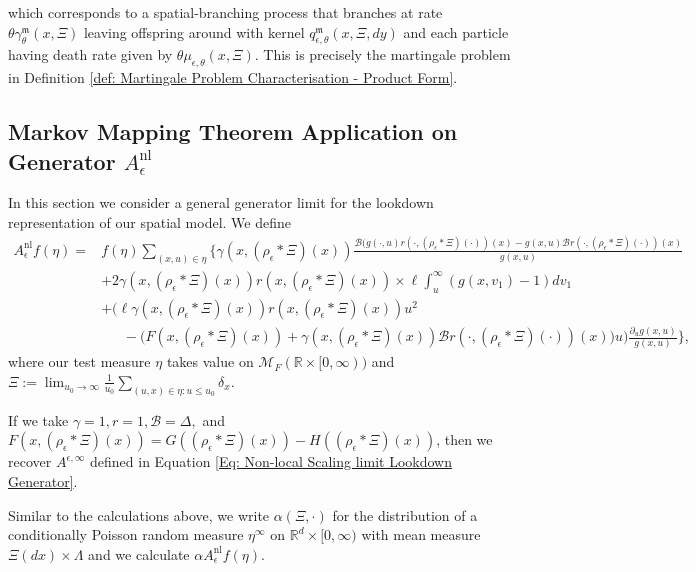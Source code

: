 \documentclass[12pt]{article}
\newcommand{\IR}{\mathbb R}
\begin{document}
which corresponds to a spatial-branching process that branches at rate $\theta\gamma^{\mathfrak{m}}_{\theta}(x,\Xi)$ leaving offspring around with kernel $ q^{\mathfrak{m}}_{\epsilon,\theta}(x,\Xi,dy)$ and each particle having death rate given by $\theta \mu_{\epsilon,\theta}(x,\Xi)$. This is precisely the martingale problem in Definition \ref{def: Martingale Problem Characterisation - Product Form}.
\newpage
\subsection{Markov Mapping Theorem Application on Generator $A^{\text{nl}}_{\epsilon}$}\label{sec: Markov Mapping Theorem application - limit}
In this section we consider a general generator limit for the lookdown representation of our spatial model. 
We define
\begin{equation}
\begin{aligned}
A^{\text{nl}}_{\epsilon}f(\eta )  =&f(\eta )\sum_{(x,u)\in\eta}\Bigg\{
 \gamma(x, (\rho_{\epsilon}*\Xi)(x))
 \frac{\mathcal{B}(g(\cdot,u)r( \cdot, (\rho_{\epsilon}* \Xi)(\cdot))(x)-g(x,u)\mathcal{B}r( \cdot, (\rho_{\epsilon}* \Xi)(\cdot))(x)}{g(x,u)}\\
 &
  +2\gamma(x, (\rho_{\epsilon}*\Xi)(x)) r(x, (\rho_{\epsilon}*\Xi)(x))\times \ell \int_u^{
\infty}(g(x,v_1)-1)dv_1\\
&
+\bigg(\ell \gamma(x, (\rho_{\epsilon}*\Xi)(x)) r(x, (\rho_{\epsilon}*\Xi)(x)) u^2 \\
&~~~~~~~-\big(F(x, (\rho_{\epsilon}*\Xi)(x))+\gamma(x, (\rho_{\epsilon}*\Xi)(x))\mathcal{B}r( \cdot, (\rho_{\epsilon}* \Xi)(\cdot))(x)\big)u\bigg) \frac {\partial_u g(x,u)}{g(x,u)}\Bigg\},
\end{aligned}    
\end{equation}
where our test measure $\eta$ takes value on $\mathcal{M}_F(\IR\times [0,\infty))$ and $\Xi:=\lim_{u_0\rightarrow\infty}\frac 1{u_0}\sum_{(u,x)\in \eta:u\leq u_0}\delta_x$.

If we take $\gamma =1, r=1, \mathcal{B}=\Delta,$ and $F(x, (\rho_{\epsilon}*\Xi)(x))=G( (\rho_{\epsilon}*\Xi)(x))-H( (\rho_{\epsilon}*\Xi)(x))$, then we recover $A^{\epsilon, \infty}$ defined in Equation \eqref{Eq: Non-local Scaling limit Lookdown Generator}.


Similar to the calculations above, we write $\alpha(\Xi,\cdot)$ for the distribution of a conditionally
Poisson random measure $\eta^{\infty}$ on $\IR^d\times [0,\infty)$ with mean measure
$\Xi(dx)\times \Lambda$ and we calculate $\alpha A^{\text{nl}}_{\epsilon}f(\eta)$. 
\end{document}
